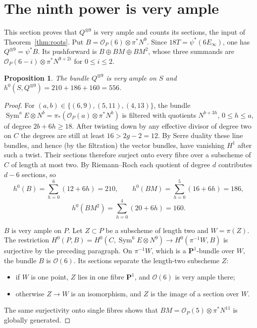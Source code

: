 \documentclass[11pt,a4paper]{article}
\theoremstyle{plain}
\newtheorem{proposition}[theorem]{Proposition}
\theoremstyle{remark}
\newcommand{\OO}{\mathcal O}
\newcommand{\PP}{\mathbf P}
\newcommand{\Sym}{\operatorname{Sym}}
\begin{document}
\section{The ninth power is very ample}

This section proves that $Q^{\otimes9}$ is very ample and counts its sections, the input of Theorem~\ref{thm:roots}.
Put $B=\OO_P(6)\otimes\pi^*N^9$. Since $18T=\psi^*(6E_\infty)$, one has $Q^{\otimes9}=\psi^*B$. Its pushforward is
$B\oplus BM\oplus BM^2$, whose three summands are $\OO_P(6-i)\otimes\pi^*N^{9+2i}$ for $0\le i\le2$.

\begin{proposition}\label{prop:Q9}
The bundle $Q^{\otimes9}$ is very ample on $S$ and $h^0(S,Q^{\otimes9})=210+186+160=556$.
\end{proposition}
\begin{proof}
For $(a,b)\in\{(6,9),(5,11),(4,13)\}$, the bundle $\Sym^aE\otimes N^b=\pi_*(\OO_P(a)\otimes\pi^*N^b)$ is filtered with
quotients $N^{b+3h}$, $0\le h\le a$, of degree $2b+6h\ge18$. After twisting down by any effective divisor of degree
two on $C$ the degrees are still at least $16>2g-2=12$. By Serre duality these line bundles, and hence (by the
filtration) the vector bundles, have vanishing $H^1$ after such a twist. Their sections therefore surject onto every
fibre over a subscheme of $C$ of length at most two. By Riemann--Roch each quotient of degree $d$ contributes $d-6$
sections, so
\[
 h^0(B)=\sum_{h=0}^6(12+6h)=210,\qquad h^0(BM)=\sum_{h=0}^5(16+6h)=186,
\]
\[
 h^0(BM^2)=\sum_{h=0}^4(20+6h)=160 .
\]

$B$ is very ample on $P$. Let $Z\subset P$ be a subscheme of length two and $W=\pi(Z)$. The restriction
$H^0(P,B)=H^0(C,\Sym^6E\otimes N^9)\to H^0(\pi^{-1}W,B)$ is surjective by the preceding paragraph. On $\pi^{-1}W$,
which is a $\PP^1$-bundle over $W$, the bundle $B$ is $\OO(6)$. Its sections separate the length-two subscheme $Z$:
\begin{itemize}
\item if $W$ is one point, $Z$ lies in one fibre $\PP^1$, and $\OO(6)$ is very ample there;
\item otherwise $Z\to W$ is an isomorphism, and $Z$ is the image of a section over $W$.
\end{itemize}
The same surjectivity onto single fibres shows that $BM=\OO_P(5)\otimes\pi^*N^{11}$ is globally generated.


\end{proof}
\end{document}
